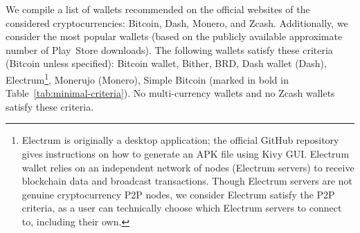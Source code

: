 We compile a list of wallets recommended on the official websites of the considered cryptocurrencies: Bitcoin, Dash, Monero, and Zcash.
Additionally, we consider the most popular wallets (based on the publicly available approximate number of Play~Store downloads).
The following wallets satisfy these criteria (Bitcoin unless specified): Bitcoin wallet, Bither, BRD, Dash wallet (Dash), Electrum\footnote{Electrum is originally a desktop application; the official GitHub repository gives instructions on how to generate an APK file using Kivy GUI. Electrum wallet relies on an independent network of nodes (Electrum servers) to receive blockchain data and broadcast transactions. Though Electrum servers are not genuine cryptocurrency P2P nodes, we consider Electrum satisfy the P2P criteria, as a user can technically choose which Electrum servers to connect to, including their own.}, Monerujo (Monero), Simple Bitcoin (marked in bold in Table~\ref{tab:minimal-criteria}).
No multi-currency wallets and no Zcash wallets satisfy these criteria.

